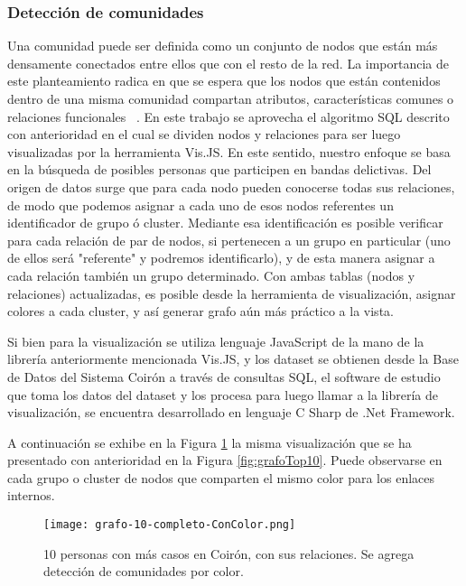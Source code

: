 \subsubsection{Detección de comunidades}
Una comunidad puede ser definida como un conjunto de nodos que están más densamente conectados entre ellos que con el resto de la red. La importancia de este planteamiento radica en que se espera que los nodos que están contenidos dentro de una misma comunidad compartan atributos, características comunes o relaciones funcionales  ~\cite{ma2014exploring}.
En este trabajo se aprovecha el algoritmo SQL descrito con anterioridad en el cual se dividen nodos y relaciones para ser luego visualizadas por la herramienta Vis.JS.
En este sentido, nuestro enfoque se basa en la búsqueda de posibles personas que participen en bandas delictivas. Del origen de datos surge que para cada nodo pueden conocerse todas sus relaciones, de modo que podemos asignar a cada uno de esos nodos referentes un identificador de grupo ó cluster. Mediante esa identificación es posible verificar para cada relación de par de nodos, si pertenecen a un grupo en particular (uno de ellos será "referente" y podremos identificarlo), y de esta manera asignar a cada relación también un grupo determinado. Con ambas tablas (nodos y relaciones) actualizadas, es posible desde la herramienta de visualización, asignar colores a cada cluster, y así generar grafo aún más práctico a la vista.

Si bien para la visualización se utiliza lenguaje JavaScript de la mano de la librería anteriormente mencionada Vis.JS, y los dataset se obtienen desde la Base de Datos del Sistema Coirón a través de consultas SQL, el software de estudio que toma los datos del dataset y los procesa para luego llamar a la librería de visualización, se encuentra desarrollado en lenguaje C Sharp de .Net Framework. 

A continuación se exhibe en la Figura \ref{fig:grafo-10-completo-ConColor} la misma visualización que se ha presentado con anterioridad en la Figura \ref{fig:grafoTop10}. Puede observarse en cada grupo o cluster de nodos que comparten el mismo color para los enlaces internos. 

\begin{figure}
	\centering
	\texttt{[image: grafo-10-completo-ConColor.png]}
	\caption{10 personas con más casos en Coirón, con sus relaciones. Se agrega detección de comunidades por color.} 
	\label{fig:grafo-10-completo-ConColor}
\end{figure}

